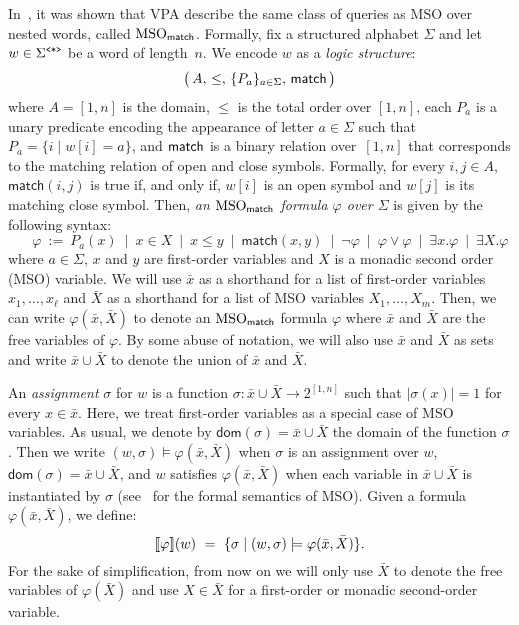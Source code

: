In~\cite{AlurM04}, it was shown that VPA describe the same class of queries as MSO over nested words, called $\text{MSO}_{\textsf{match}}$.
Formally, fix a structured alphabet $\Sigma$ and let $w \in \Sigma^{\texttt{<*>}}$ be a word of length~$n$. 
We encode $w$ as a \emph{logic structure}:
$$
\big(\, A, \, \leq,\, \{P_a\}_{a\in\Sigma}, \, \sf{match} \, \big)
$$
where $A = [1,n]$ is the domain, $\leq$ 
is the total order over $[1, n]$, each $P_a$ is a unary predicate encoding the appearance of letter $a \in \Sigma$ such that $P_a = \{i \mid w[i] = a\}$, and $\sf{match}$ is a binary relation over~$[1,n]$ that corresponds to the matching relation of open and close symbols. Formally, for every $i, j \in A$, $\textsf{match}(i, j)$ is true if, and only if, $w[i]$ is an open symbol and $w[j]$ is its matching close symbol.
Then, \emph{an $\text{MSO}_{\textsf{match}}$ formula $\varphi$ over $\Sigma$} is given by the following syntax:
\[
\ \ \ \ \ \ \, \varphi \ :=\ P_a(x) \ \mid\  x \in X \ \mid \ x \leq y \ \mid \ \textsf{match}(x, y) \ \mid \ \neg \varphi \ \mid \ \varphi \vee \varphi \ \mid \ \exists x.\varphi \ \mid \ \exists X.\varphi 
\]
where $a\in\Sigma$, $x$ and $y$ are first-order variables and $X$ is a monadic second order (MSO) variable.
We will use $\bar{x}$ as a shorthand for a list of first-order variables $x_1,\ldots,x_{\ell}$ and $\bar{X}$ as a shorthand for a list of MSO variables $X_1,\ldots,X_m$.
Then, we can write $\varphi(\bar{x}, \bar{X})$ to denote an $\text{MSO}_{\textsf{match}}$ formula $\varphi$ where $\bar{x}$ and $\bar{X}$ are the free variables of $\varphi$. By some abuse of notation, we will also use $\bar{x}$ and $\bar{X}$ as sets and write $\bar{x} \cup \bar{X}$ to denote the union of $\bar{x}$ and $\bar{X}$.

An \emph{assignment} $\sigma$ for $w$ is a function $\sigma\colon \bar{x}\cup \bar{X}\to 2^{[1,n]}$ such that $|\sigma(x)| = 1$ for every $x \in \bar{x}$. Here, we treat first-order variables as a special case of MSO variables. 
As usual, we denote by $\textsf{dom}(\sigma) = \bar{x}\cup \bar{X}$ the domain of the function $\sigma$. 
Then we write $(w, \sigma) \models \varphi(\bar{x}, \bar{X})$ when $\sigma$ is an assignment over $w$, $\textsf{dom}(\sigma) = \bar{x}\cup \bar{X}$, and $w$ satisfies $\varphi(\bar{x}, \bar{X})$ when each variable in $\bar{x}\cup \bar{X}$ is instantiated by $\sigma$ (see~\cite{libkin2004elements} for the formal semantics of MSO). 
Given a formula $\varphi(\bar{x},\bar{X})$, we define: 
$$
{\llbracket{\varphi}\rrbracket}(w) \ = \ \{\sigma \mid (w, \sigma) \models \varphi(\bar{x},\bar{X})\}.
$$ 
For the sake of simplification, from now on we will only use $\bar{X}$ to denote the free variables of $\varphi(\bar{X})$ and use $X \in \bar{X}$ for a first-order or monadic second-order variable.

